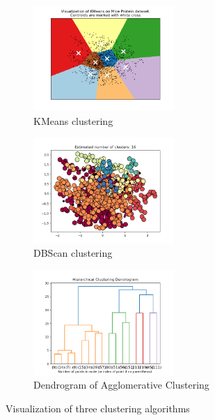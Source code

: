 \documentclass[12pt,a4paper]{article}
\begin{document}
\begin{figure}[H]
    \centering
    \begin{subfigure}[b]{0.3\textwidth}
        \centering
        \includegraphics[width=\linewidth, height=4cm]{figures/kmeans_vis.png}
        \caption{KMeans clustering}
        \label{fig:kmeans_visualization}
    \end{subfigure}
    \hfill
    \begin{subfigure}[b]{0.3\textwidth}
        \includegraphics[width=\linewidth, height=4cm]{figures/dbscan_vis.png}
        \caption{DBScan clustering}
        \label{fig:dbscan_visualization}
    \end{subfigure}
    \hfill
    \begin{subfigure}[b]{0.3\textwidth}
        \includegraphics[width=\linewidth, height=4cm]{figures/dendrogram_vis.png}
        \caption{Dendrogram of Agglomerative Clustering}
        \label{fig:dendrogram_distribution}
    \end{subfigure}
    \caption{Visualization of three clustering algorithms}
    \label{fig:clustering_visualization}
\end{figure}

\end{document}
